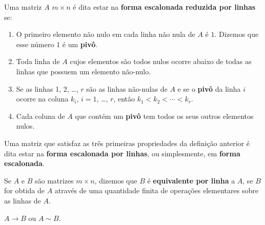 \documentclass{beamer}
\begin{document}
    \begin{frame}
        \begin{definicao}\label{linhareduzida}
            Uma matriz $A$ $m \times n$ \'e \pause dita estar na \textbf{forma escalonada reduzida por linhas} se:\pause
            \begin{enumerate}[label={\roman*})]
                \item O primeiro elemento n\~ao nulo \pause em cada linha n\~ao nula de $A$ \pause \'e $1$. \pause Dizemos que esse número 1 é um \textbf{pivô}.\pause

                \vspace{.3cm}

                \item Toda linha de $A$ cujos elementos s\~ao todos nulos \pause ocorre abaixo de todas as linhas que possuem um elemento n\~ao-nulo.\pause

                \vspace{.3cm}

                \item Se as linhas 1, 2, \dots, $r$ s\~ao as linhas n\~ao-nulas de $A$ \pause e se o \textbf{pivô} da linha $i$ ocorre na coluna $k_i$, \pause $i = 1$, \dots, $r$, \pause ent\~ao $k_1 < k_2 < \cdots < k_r$.\pause

                \vspace{.3cm}

                \item Cada coluna de $A$ que cont\'em um \textbf{pivô} \pause tem todos os seus outros elementos nulos.
            \end{enumerate}
        \end{definicao}
    \end{frame}

    \begin{frame}
        \begin{observacao}
            Uma matriz que satisfaz as três primeiras propriedades da definição anterior \pause é dita estar na \textbf{forma escalonada por linhas}, \pause ou simplesmente, em \textbf{forma escalonada}.
        \end{observacao}
    \end{frame}

    \begin{frame}
        \begin{definicao}
	    Se $A$ e $B$ s\~ao matrizes $m \times n$, \pause dizemos que $B$ \'e \textbf{equivalente por linha} \pause a $A$, \pause se $B$ for obtida de $A$ \pause atrav\'es de uma quantidade finita de opera\c{c}\~oes elementares sobre as linhas de $A$.\pause
        \end{definicao}

        \vspace{.6cm}

        \begin{notacao}
	    $A \rightarrow B$ \pause ou $A \sim B$.
        \end{notacao}
    \end{frame}
\end{document}
